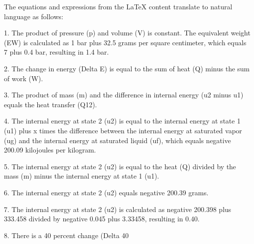 The equations and expressions from the LaTeX content translate to natural language as follows:

1. The product of pressure (p) and volume (V) is constant. The equivalent weight (EW) is calculated as 1 bar plus 32.5 grams per square centimeter, which equals 7 plus 0.4 bar, resulting in 1.4 bar.

2. The change in energy (Delta E) is equal to the sum of heat (Q) minus the sum of work (W).

3. The product of mass (m) and the difference in internal energy (u2 minus u1) equals the heat transfer (Q12).

4. The internal energy at state 2 (u2) is equal to the internal energy at state 1 (u1) plus x times the difference between the internal energy at saturated vapor (ug) and the internal energy at saturated liquid (uf), which equals negative 200.09 kilojoules per kilogram.

5. The internal energy at state 2 (u2) is equal to the heat (Q) divided by the mass (m) minus the internal energy at state 1 (u1).

6. The internal energy at state 2 (u2) equals negative 200.39 grams.

7. The internal energy at state 2 (u2) is calculated as negative 200.398 plus 333.458 divided by negative 0.045 plus 3.33458, resulting in 0.40.

8. There is a 40 percent change (Delta 40%